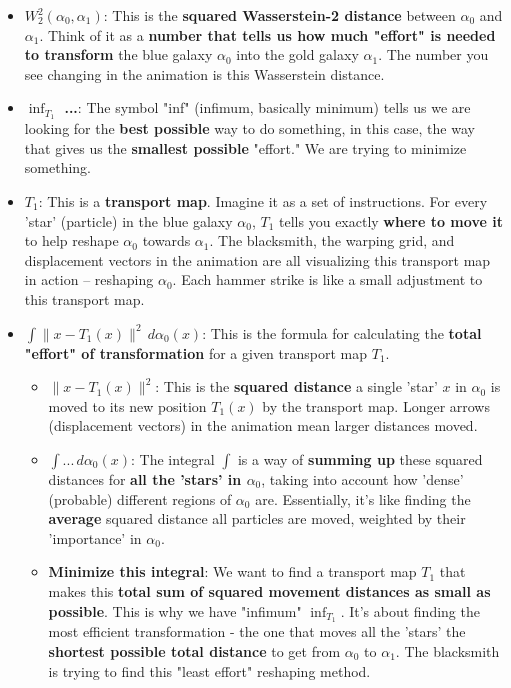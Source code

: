 \documentclass{article}
\begin{document}
\begin{itemize}
    \item \textbf{\( W_2^2(\alpha_0, \alpha_1) \)}: This is the \textbf{squared Wasserstein-2 distance} between \( \alpha_0 \) and \( \alpha_1 \).  Think of it as a \textbf{number that tells us how much "effort" is needed to transform} the blue galaxy \( \alpha_0 \) into the gold galaxy \( \alpha_1 \). The number you see changing in the animation is this Wasserstein distance.
    \item \textbf{\( \inf_{T_1} \) ...}: The symbol "inf" (infimum, basically minimum) tells us we are looking for the \textbf{best possible} way to do something, in this case, the way that gives us the \textbf{smallest possible} "effort." We are trying to minimize something.
    \item \textbf{\( T_1 \)}: This is a \textbf{transport map}.  Imagine it as a set of instructions. For every 'star' (particle) in the blue galaxy \( \alpha_0 \), \( T_1 \) tells you exactly \textbf{where to move it} to help reshape \( \alpha_0 \) towards \( \alpha_1 \).  The blacksmith, the warping grid, and displacement vectors in the animation are all visualizing this transport map in action – reshaping \( \alpha_0 \).  Each hammer strike is like a small adjustment to this transport map.
    \item \textbf{\( \int \|x - T_1(x)\|^2 \, d\alpha_0(x) \)}:  This is the formula for calculating the \textbf{total "effort" of transformation} for a given transport map \( T_1 \).
        \begin{itemize}
            \item \textbf{\( \|x - T_1(x)\|^2 \)}: This is the \textbf{squared distance} a single 'star' \( x \) in \( \alpha_0 \) is moved to its new position \( T_1(x) \) by the transport map. Longer arrows (displacement vectors) in the animation mean larger distances moved.
            \item \textbf{\( \int ... \, d\alpha_0(x) \)}: The integral \( \int \) is a way of \textbf{summing up} these squared distances for \textbf{all the 'stars' in \( \alpha_0 \)}, taking into account how 'dense' (probable) different regions of \( \alpha_0 \) are.  Essentially, it's like finding the \textbf{average} squared distance all particles are moved, weighted by their 'importance' in \( \alpha_0 \).
            \item \textbf{Minimize this integral}: We want to find a transport map \( T_1 \) that makes this \textbf{total sum of squared movement distances as small as possible}.  This is why we have "infimum" \( \inf_{T_1} \).  It's about finding the most efficient transformation - the one that moves all the 'stars' the \textbf{shortest possible total distance} to get from \( \alpha_0 \) to \( \alpha_1 \).  The blacksmith is trying to find this "least effort" reshaping method.

\end{itemize}
\end{itemize}
\end{document}
